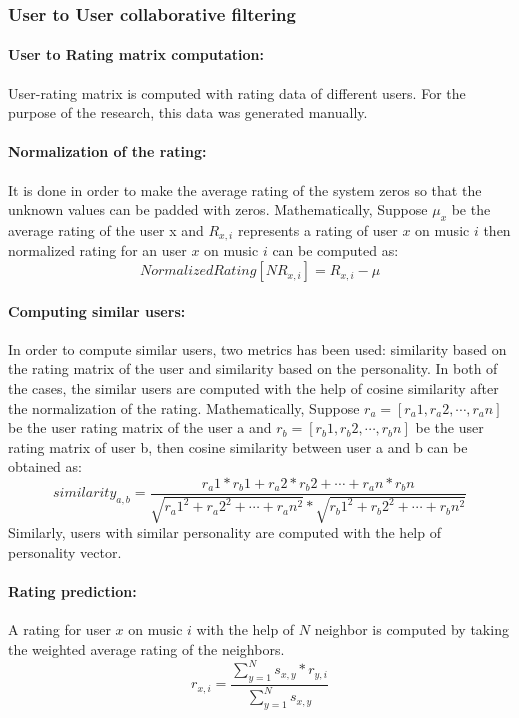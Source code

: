 \documentclass[journal]{IEEEtran}
\begin{document}
\subsubsection{User to User collaborative filtering}

  \paragraph{User to Rating matrix computation:} User-rating matrix is computed with rating data of different users. For the purpose of the research, this data was generated manually.
  \paragraph{Normalization of the rating:} It is done in order to make the average rating of the system zeros so that the unknown values can be padded with zeros.
Mathematically,
Suppose $\mu_x$ be the average rating of the user x and $R_{x,i}$ represents a rating of user $x$ on music $i$ then normalized rating for an user $x$ on music $i$ can be computed as:
\begin{equation}\label{eq:normal}
  Normalized Rating[NR_{x,i}] = R_{x,i} - \mu
\end{equation}
\paragraph{Computing similar users:} In order to compute similar users, two metrics has been used: similarity based on the rating matrix of the user and similarity based on the personality. In both of the cases, the similar users are computed with the help of cosine similarity after the normalization of the rating.
Mathematically,
Suppose $r_a = [r_a1,r_a2,\cdots,r_an]$ be the user rating matrix of the user a and  $r_b = [r_b1,r_b2,\cdots,r_bn]$ be the user rating matrix of user b, then cosine similarity between user a and b can be obtained as:
\begin{equation}
  similarity_{a,b} = \frac{r_a1*r_b1 + r_a2*r_b2 +\cdots+ r_an*r_bn}{\sqrt{{r_a1}^2+{r_a2}^2+\cdots+{r_an}^2} * \sqrt{{r_b1}^2+{r_b2}^2+\cdots+{r_bn}^2} }
\end{equation}
Similarly, users with similar personality are computed with the help of personality vector.\hfill
\paragraph{Rating prediction:} A rating for user $x$ on music $i$ with the help of $N$ neighbor is computed by taking the weighted average rating of the neighbors.
\begin{equation}\label{eq:cf}
  r_{x,i} = \frac{\sum_{y=1}^N s_{x,y}*r_{y,i}}{\sum_{y=1}^N s_{x,y}}
\end{equation}
\end{document}
